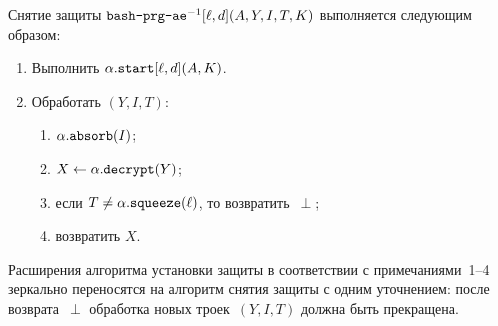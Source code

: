 Снятие защиты $\texttt{bash-prg-ae}^{-1}[\ell,d](A,Y,I,T,K)$ выполняется 
следующим образом:
\begin{enumerate}
\item
Выполнить $\alpha.\texttt{start}[\ell,d](A,K)$.
\item
Обработать $(Y,I,T)$:
\begin{enumerate}
\item
$\alpha.\texttt{absorb}(I)$;
\item
$X\leftarrow\alpha.\texttt{decrypt}(Y)$;
\item
если $T\neq\alpha.\texttt{squeeze}(\ell)$, то возвратить~$\perp$;
\item
возвратить $X$.
\end{enumerate}
\end{enumerate}

\begin{note}
Расширения алгоритма установки защиты в соответствии с примечаниями~1--4 
зеркально переносятся на алгоритм снятия защиты с одним уточнением: после 
возврата~$\perp$ обработка новых троек~$(Y,I,T)$ должна быть прекращена.
\end{note}
